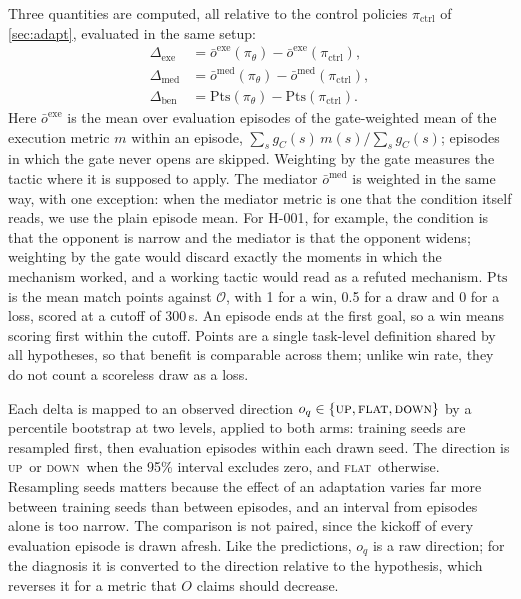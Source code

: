 \documentclass[11pt]{article}
\newcommand{\opp}{\mathcal{O}}           %
\newcommand{\pUp}{\textsc{up}}
\newcommand{\pFlat}{\textsc{flat}}
\newcommand{\pDown}{\textsc{down}}
\begin{document}
Three quantities are computed, all relative to the control policies $\pi_{\mathrm{ctrl}}$ of \cref{sec:adapt}, evaluated in the same setup:
\begin{align}
  \Delta_{\mathrm{exe}} &= \bar o^{\mathrm{exe}}(\pi_\theta) - \bar o^{\mathrm{exe}}(\pi_{\mathrm{ctrl}}), \\
  \Delta_{\mathrm{med}} &= \bar o^{\mathrm{med}}(\pi_\theta) - \bar o^{\mathrm{med}}(\pi_{\mathrm{ctrl}}), \\
  \Delta_{\mathrm{ben}} &= \mathrm{Pts}(\pi_\theta) - \mathrm{Pts}(\pi_{\mathrm{ctrl}}).
\end{align}
Here $\bar o^{\mathrm{exe}}$ is the mean over evaluation episodes of the gate-weighted mean of the execution metric $m$ within an episode, $\sum_s g_C(s)\,m(s) / \sum_s g_C(s)$; episodes in which the gate never opens are skipped.
Weighting by the gate measures the tactic where it is supposed to apply.
The mediator $\bar o^{\mathrm{med}}$ is weighted in the same way, with one exception: when the mediator metric is one that the condition itself reads, we use the plain episode mean.
For H-001, for example, the condition is that the opponent is narrow and the mediator is that the opponent widens; weighting by the gate would discard exactly the moments in which the mechanism worked, and a working tactic would read as a refuted mechanism.
$\mathrm{Pts}$ is the mean match points against $\opp$, with 1 for a win, 0.5 for a draw and 0 for a loss, scored at a cutoff of 300\,s.
An episode ends at the first goal, so a win means scoring first within the cutoff.
Points are a single task-level definition shared by all hypotheses, so that benefit is comparable across them; unlike win rate, they do not count a scoreless draw as a loss.

Each delta is mapped to an observed direction $o_q \in \{\pUp,\pFlat,\pDown\}$ by a percentile bootstrap at two levels, applied to both arms: training seeds are resampled first, then evaluation episodes within each drawn seed.
The direction is \pUp\ or \pDown\ when the 95\% interval excludes zero, and \pFlat\ otherwise.
Resampling seeds matters because the effect of an adaptation varies far more between training seeds than between episodes, and an interval from episodes alone is too narrow.
The comparison is not paired, since the kickoff of every evaluation episode is drawn afresh.
Like the predictions, $o_q$ is a raw direction; for the diagnosis it is converted to the direction relative to the hypothesis, which reverses it for a metric that $O$ claims should decrease.
\end{document}

